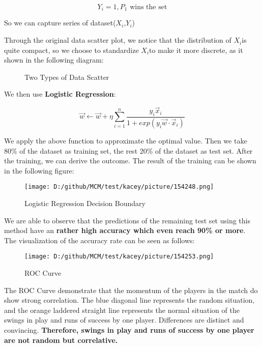 \documentclass{mcmthesis}
\begin{document}
\begin{equation} \label{5}
    Y_{i} = 1, P_{1} \text{ wins the set}
\end{equation}

So we can capture series of dataset($X_{i}$,$Y_{i}$)

Through the original data scatter plot, we notice that the distribution of $X_{i}$is quite compact, so we choose to standardize $X_{i}$to make it more discrete, as it shown in the following diagram:
\begin{figure}[htbp]
    \centering
    \caption{Two Types of Data Scatter} \label{Figure 13}
\end{figure}


We then use {\bf Logistic Regression}:

\begin{equation} \label{6}
    \vec{w}\gets \vec{w}+\eta \sum_{i=1}^{n} \frac{y_{i}\vec{x}_{i}}{1+exp(y_{i}\vec{w}\cdot\vec{x}_{i}) }
\end{equation}

We apply the above function to approximate the optimal value. Then we take 80\% of the
dataset as training set, the rest 20\% of the dataset as test set.\cite{5} After the training, we can derive
the outcome. The result of the training can be shown in the following figure:

\begin{figure}[htbp]
    \centering
    \texttt{[image: D:/github/MCM/test/kacey/picture/154248.png]}
    \caption{Logistic Regression Decision Boundary} \label{Figure 14}
\end{figure}

We are able to observe that the predictions of the remaining test set using this method have an
{\bf rather high accuracy which even reach 90\% or more}. \\
The visualization of the accuracy rate can be seen as follows:

\begin{figure}[htbp]
    \centering
    \texttt{[image: D:/github/MCM/test/kacey/picture/154253.png]}
    \caption{ROC Curve} \label{Figure 15}
\end{figure}

The ROC Curve demonstrate that the momentum of the players in the match do show strong
correlation. The blue diagonal line represents the random situation, and the orange laddered
straight line represents the normal situation of the swings in play and runs of success by one player. Differences are distinct and convincing. {\bf Therefore, swings in play and runs of success by one
player are not random but correlative.}
\end{document}
